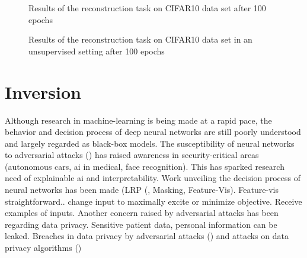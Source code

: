 \begin{figure}[H]
    \centering
    
    
    \caption{Results of the reconstruction task on CIFAR10 data set after 100 epochs}
    \label{fig:CIFAR_Images}
\end{figure}

\begin{figure}[H]
    \centering
    
    
    \caption{Results of the reconstruction task on CIFAR10 data set in an unsupervised setting after 100 epochs}

    \label{fig:CIFAR_Images_unsupervised}
\end{figure}




\section{Inversion}




Although research in machine-learning is being made at a rapid pace,
the behavior and decision process of deep neural networks are 
still poorly understood and largely
regarded as black-box models.
The susceptibility of neural networks to adversarial attacks (\cite{moosavidezfooli2016deepfool}) has raised awareness
in security-critical areas (autonomous cars, ai in medical, face recognition).
This has sparked research need of explainable ai and interpretability.
Work unveiling the decision process of neural networks has been made 
(LRP (\cite{Bach2015OnPE}, Masking, Feature-Vis).
Feature-vis straightforward.. change input to maximally excite or minimize objective.
Receive examples of inputs.
Another concern raised by adversarial attacks has been regarding data privacy.
Sensitive patient data, personal information can be leaked.
Breaches in data privacy by adversarial attacks (\cite{carlini2020attack})
and attacks on data privacy algorithms (\cite{carlini2020extracting})



